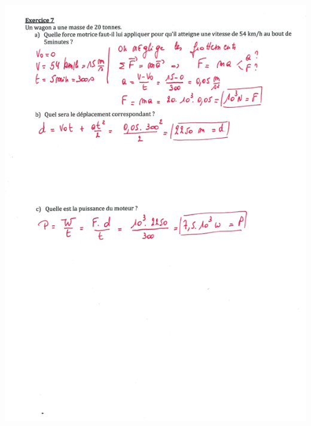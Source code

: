 \includegraphics[width=18.251cm,height=25.141cm]{Pictures/100000010000024A0000032885BF0DEB477D1AAA.png}


